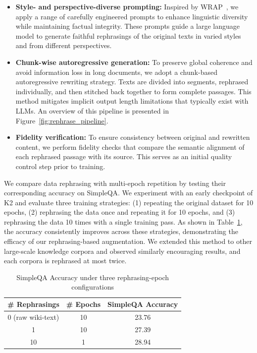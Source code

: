 \begin{itemize}
    \item \textbf{Style- and perspective-diverse prompting:} Inspired by WRAP~\citep{maini2024rephrasingwebrecipecompute}, we apply a range of carefully engineered prompts to enhance linguistic diversity while maintaining factual integrity. These prompts guide a large language model to generate faithful rephrasings of the original texts in varied styles and from different perspectives.
    
    \item \textbf{Chunk-wise autoregressive generation:} To preserve global coherence and avoid information loss in long documents, we adopt a chunk-based autoregressive rewriting strategy. Texts are divided into segments, rephrased individually, and then stitched back together to form complete passages. This method mitigates implicit output length limitations that typically exist with LLMs. An overview of this pipeline is presented in Figure~\ref{fig:rephrase_pipeline}.

    \item \textbf{Fidelity verification:} To ensure consistency between original and rewritten content, we perform fidelity checks that compare the semantic alignment of each rephrased passage with its source. This serves as an initial quality control step prior to training.
\end{itemize}

We compare data rephrasing with multi-epoch repetition by testing their corresponding accuracy on SimpleQA.
We experiment with an early checkpoint of K2 and evaluate three training strategies: (1) repeating the original dataset for 10 epochs, (2) rephrasing the data once and repeating it for 10 epochs, and (3) rephrasing the data 10 times with a single training pass. 
As shown in Table~\ref{tab:rewrites_epochs_f1}, the accuracy consistently improves across these strategies, demonstrating the efficacy of our rephrasing-based augmentation. We extended this method to other large-scale knowledge corpora and observed similarly encouraging results, and each corpora is rephrased at most twice.


\begin{table}[htbp]
\centering
\caption{SimpleQA Accuracy under three rephrasing-epoch configurations}
\label{tab:rewrites_epochs_f1}
\begin{tabular}{ccc}
\toprule
\# Rephrasings & \# Epochs & SimpleQA Accuracy \\
\midrule
0 (raw wiki-text) & 10 & 23.76 \\
1            & 10 & 27.39 \\
10           & 1  & 28.94 \\
\bottomrule
\end{tabular}
\end{table}



